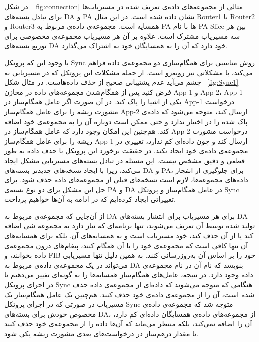 در شکل ~\ref{fig:connection} مثالی از مجموعه‌های داده‌ی تعریف شده در مسیریاب‌ها برای تبادل بسته‌های DA و PA  نشان داده شده است. در این مثال Router1 با Router2 و Router3 همسایه است. مجموعه‌ی داده‌ی مربوط به PA ها با نام PA Slice بین هر سه مسیریاب مشترک است. علاوه بر آن هر مسیریاب مجموعه‌ی مخصوصی برای توزیع بسته‌های DA خود دارد که آن را به همسایگان خود به اشتراک می‌گذارد.

با وجود این که پروتکل Sync روش مناسبی برای همگام‌سازی دو مجموعه‌ی داده فراهم می‌کند، با مشکلاتی نیز روبه‌رو است. از جمله مشکلات این پروتکل که در مسیریابی به چشم می‌آید عدم پشتیبانی صحیح از حذف داده‌هاست. در مثال شکل ~\ref{fig:Sync1} فرض کنید پس از همگام‌شدن مجموعه‌های داده در مخازن App-1 و App-2، App-1 یکی از اشیا را پاک کند. در آن صورت اگر عامل همگام‌ساز در App-1 درخواست مشورت ریشه را برای عامل همگام‌ساز App-2 ارسال کند، متوجه می‌شود که داده‌ی پاک شده را در اختیار ندارد و حتی ممکن است دوباره آن را به مجموعه‌ی خود اضافه کند. هم‌چنین این امکان وجود دارد که عامل همگام‌ساز در App-2 درخواست مشورت ریشه را برای عامل همگام‌ساز App-1 ارسال کند و چون داده‌ای کم ندارد، تغییری در مجموعه‌ی داده‌ی خود ایجاد نکند. در حقیقت برخورد این پروتکل با حذف داده به طور قطعی و دقیق مشخص نیست. این مسئله در تبادل بسته‌های مسیریابی مشکل ایجاد می‌کند، زیرا با ایجاد نسخه‌های جدیدتر بسته‌های DA و PA، برای جلوگیری از انفجار داده‌های مجموعه‌ها، لازم است نسخه‌های قبلی از مجموعه‌های داده حذف شود. برای حل این مشکل برای دو نوع بسته‌ی PA و DA در عامل همگام‌ساز و پروتکل Sync تغییراتی ایجاد کرده‌ایم که در ادامه به آن‌ها خواهیم پرداخت.

از آن‌جایی که مجموعه‌ی مربوط به DA برای هر مسیریاب برای انتشار بسته‌های DA تولید شده توسط آن تعریف می‌شوند، تنها برنامه‌ای که نیاز دارد به مجموعه شی اضافه کند یا از آن حذف کند، خود مسیریاب است و نه همسایه‌های آن. بلکه برای همسایه‌های آن تنها کافی است که مجموعه‌ی خود را با آن همگام کنند، پیغام‌های درون مجموعه‌ی داده بخوانند، و FIB خود را بر اساس آن به‌روزرسانی کنند. به همین دلیل تنها مسیریابی می‌تواند در یک مجموعه‌ی داده‌ی مربوط به DA بنویسد که نام آن در نام مجموعه‌ی داده وجود دارد. در نتیجه، عامل‌های همگام‌ساز همسایه‌ها را به گونه‌ای تغییر می‌دهیم تا در اجرای پروتکل Sync هنگامی که متوجه می‌شوند که داده‌ای از مجموعه‌ی داده حذف شده است، آن را از مجموعه‌ی داده‌ی خود حذف کنند. هم‌چنین یک عامل همگام‌ساز یک مسیریاب در صورتی که در اجرای پروتکل Sync متوجه شد که مجموعه‌ی داده‌ی مخصوص خودش برای بسته‌های DA، از مجموعه‌های داده‌ی همسایگان داده‌ای کم دارد، آن را اضافه نمی‌کند، بلکه منتظر می‌ماند که آن‌ها داده را از مجموعه‌ی خود حذف کنند تا مقدار درهم‌ساز در درخواست‌های بعدی مشورت ریشه یکی شود. 

